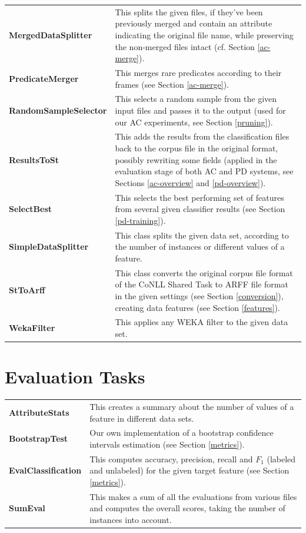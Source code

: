 \documentclass[12pt,notitlepage]{report}
\begin{document}
\begin{longtable}{p{}p{}}
\bf MergedDataSplitter & This splits the given files, if they've been previously merged and contain an attribute indicating the original file name, while preserving the non-merged files intact (cf. Section \ref{ac-merge}). \\
\bf PredicateMerger & This merges rare predicates according to their frames (see Section \ref{ac-merge}). \\
\bf RandomSampleSelector & This selects a random sample from the given input files and passes it to the output (used for our AC experiments, see Section \ref{pruning}). \\
\bf ResultsToSt & This adds the results from the classification files back to the corpus file in the original format, possibly rewriting some fields (applied in the evaluation stage of both AC and PD systems, see Sections \ref{ac-overview} and \ref{pd-overview}). \\
\bf SelectBest & This selects the best performing set of features from several given classifier results (see Section \ref{pd-training}). \\
\bf SimpleDataSplitter & This class splits the given data set, according to the number of instances or different values of a feature. \\
\bf StToArff & This class converts the original corpus file format of the CoNLL Shared Task to ARFF file format in the given settings (see Section \ref{conversion}), creating data features (see Section \ref{features}). \\
\bf WekaFilter & This applies any WEKA filter to the given data set. \\
\end{longtable}

\section*{Evaluation Tasks}

\footnotesize
\renewcommand{\arraystretch}{1.5}
\begin{longtable}{p{}p{}}
\bf AttributeStats & This creates a summary about the number of values of a feature in different data sets. \\
\bf BootstrapTest & Our own implementation of a bootstrap confidence intervals estimation (see Section \ref{metrics}). \\
\bf EvalClassification & This computes accuracy, precision, recall and $F_1$ (labeled and unlabeled) for the given target feature (see Section \ref{metrics}). \\
\bf SumEval & This makes a sum of all the evaluations from various files and computes the overall scores, taking the number of instances into account. \\
\end{longtable}
\end{document}
